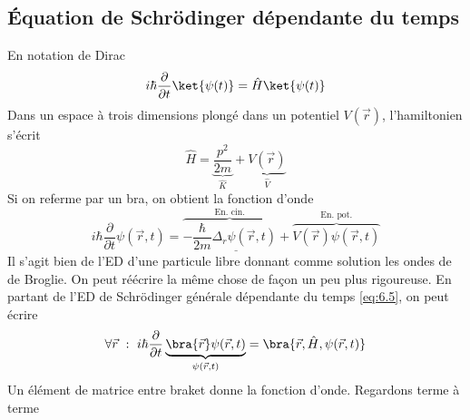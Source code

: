 	\subsection{Équation de Schrödinger dépendante du temps}
	En notation de Dirac
	\begin{equation}
	i\hbar\frac{\partial}{\partial t}\ket{\psi(t)} = \hat{H}\ket{\psi(t)}
	\label{eq:6.5}
	\end{equation}
	Dans un espace à trois dimensions plongé dans un potentiel $V(\vec r)$, l'hamiltonien 
	s'écrit
	\begin{equation}
	\hat{H} = \underbrace{\frac{p^2}{2m}}_{\hat{K}} + \underbrace{V(\vec{r})}_{\hat{V}}
	\end{equation}
	Si on referme par un bra, on obtient la fonction d'onde
	\begin{equation}
\underline{i\hbar \frac{\partial}{\partial t}\psi(\vec{r},t) = \overbrace{-\frac{\hbar}
	{2m}\Delta_r\psi(\vec{r},t)}^{\text{En. cin.}} + \overbrace{V(\vec{r})\psi(\vec{r},t)}^{\text{En. pot.}}}
	\end{equation}
	Il s'agit bien de l'ED d'une particule libre donnant comme solution les ondes de de Broglie. 
	On peut réécrire la même chose de façon un peu plus rigoureuse. En partant de l'ED de Schrödinger 
	générale dépendante du temps \eqref{eq:6.5}, on peut écrire
	\begin{equation}
	\forall\vec{r}\ :\ i\hbar\frac{\partial}{\partial t}\underbrace{\bra{\vec{r}}\psi(\vec{r},t)}_{\psi(\vec{r},
	t)} = \bra{\vec{r},\hat{H},\psi(\vec{r},t)}
	\end{equation}
	Un élément de matrice entre braket donne la fonction d'onde. Regardons terme à terme
